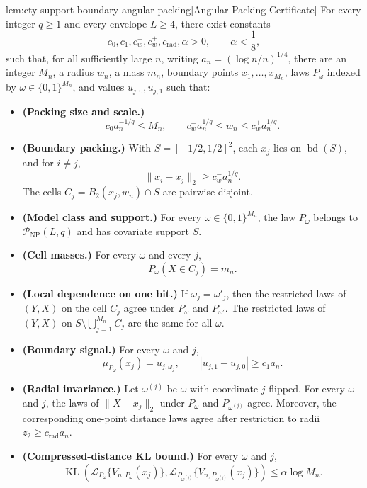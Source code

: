 \documentclass[11pt]{article}
\begin{document}
\begin{lemmav}{lem:cty-support-boundary-angular-packing}[Angular Packing Certificate]
For every integer \(q\geq 1\) and every envelope \(L\geq 4\), there exist constants
\[
c_0,c_1,c_w^-,c_w^+,c_{\mathrm{rad}},\alpha>0,
\qquad \alpha<\frac18,
\]
such that, for all sufficiently large \(n\), writing \(a_n=(\log n/n)^{1/4}\), there are an integer \(M_n\), a radius \(w_n\), a mass \(m_n\), boundary points \(x_1,\ldots,x_{M_n}\), laws \(P_\omega\) indexed by \(\omega\in\{0,1\}^{M_n}\), and values \(u_{j,0},u_{j,1}\) such that:
\begin{itemize}
\item \textbf{(Packing size and scale.)}
\[
c_0 a_n^{-1/q}\leq M_n,
\qquad
c_w^- a_n^{1/q}\leq w_n\leq c_w^+ a_n^{1/q}.
\]
\item \textbf{(Boundary packing.)} With \(S=[-1/2,1/2]^2\), each \(x_j\) lies on \(\operatorname{bd}(S)\), and for \(i\neq j\),
\[
\|x_i-x_j\|_2\geq c_w^- a_n^{1/q}.
\]
The cells \(C_j=B_2(x_j,w_n)\cap S\) are pairwise disjoint.
\item \textbf{(Model class and support.)} For every \(\omega\in\{0,1\}^{M_n}\), the law \(P_\omega\) belongs to \(\mathcal P_{\mathrm{NP}}(L,q)\) and has covariate support \(S\).
\item \textbf{(Cell masses.)} For every \(\omega\) and every \(j\),
\[
P_\omega(X\in C_j)=m_n.
\]
\item \textbf{(Local dependence on one bit.)} If \(\omega_j=\omega'_j\), then the restricted laws of \((Y,X)\) on the cell \(C_j\) agree under \(P_\omega\) and \(P_{\omega'}\). The restricted laws of \((Y,X)\) on \(S\setminus\bigcup_{j=1}^{M_n}C_j\) are the same for all \(\omega\).
\item \textbf{(Boundary signal.)} For every \(\omega\) and \(j\),
\[
\mu_{P_\omega}(x_j)=u_{j,\omega_j},
\qquad
|u_{j,1}-u_{j,0}|\geq c_1 a_n.
\]
\item \textbf{(Radial invariance.)} Let \(\omega^{(j)}\) be \(\omega\) with coordinate \(j\) flipped. For every \(\omega\) and \(j\), the laws of \(\|X-x_j\|_2\) under \(P_\omega\) and \(P_{\omega^{(j)}}\) agree. Moreover, the corresponding one-point distance laws agree after restriction to radii \(z_2\geq c_{\mathrm{rad}}a_n\).
\item \textbf{(Compressed-distance KL bound.)} For every \(\omega\) and \(j\),
\[
\operatorname{KL}\!\left(
\mathcal L_{P_\omega}\{V_{n,P_\omega}(x_j)\},
\mathcal L_{P_{\omega^{(j)}}}\{V_{n,P_{\omega^{(j)}}}(x_j)\}
\right)
\leq \alpha\log M_n.
\]
\end{itemize}
\end{lemmav}
\end{document}
